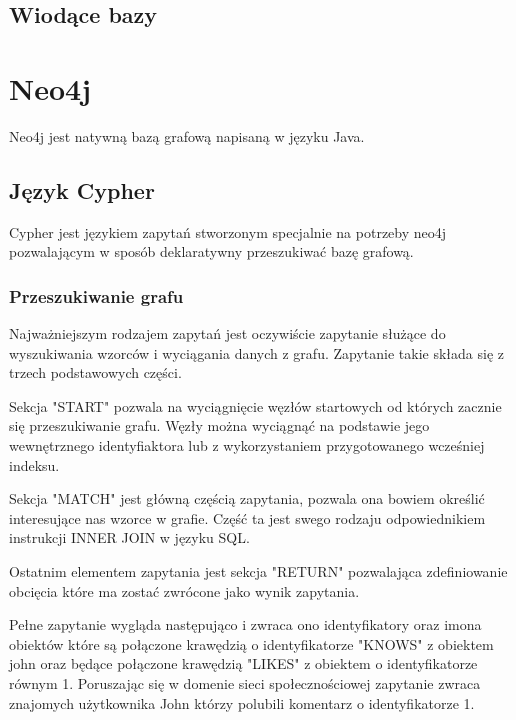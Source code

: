 \documentclass[brudnopis]{xmgr}
\begin{document}
\section{Wiodące bazy}

\chapter{Neo4j}

Neo4j jest natywną bazą grafową napisaną w języku Java. 

\section{Język Cypher}
Cypher jest językiem zapytań stworzonym specjalnie na potrzeby neo4j pozwalającym w sposób deklaratywny przeszukiwać bazę grafową.

\subsection{Przeszukiwanie grafu}

Najważniejszym rodzajem zapytań jest oczywiście zapytanie służące do wyszukiwania wzorców i wyciągania danych z grafu. Zapytanie takie składa się z trzech podstawowych części.

Sekcja "START" pozwala na wyciągnięcie węzłów startowych od których zacznie się przeszukiwanie grafu. Węzły można wyciągnąć na podstawie jego wewnętrznego identyfiaktora lub z wykorzystaniem przygotowanego wcześniej indeksu.



Sekcja "MATCH" jest główną częścią zapytania, pozwala ona bowiem określić interesujące nas wzorce w grafie. Część ta jest swego rodzaju odpowiednikiem instrukcji INNER JOIN w języku SQL.



Ostatnim elementem zapytania jest sekcja "RETURN" pozwalająca zdefiniowanie obcięcia które ma zostać zwrócone jako wynik zapytania.



Pełne zapytanie wygląda następująco i zwraca ono identyfikatory oraz imona obiektów które są połączone krawędzią o identyfikatorze "KNOWS" z obiektem john oraz będące połączone krawędzią "LIKES" z obiektem o identyfikatorze równym 1. Poruszając się w domenie sieci społecznościowej zapytanie zwraca znajomych użytkownika John którzy polubili komentarz o identyfikatorze 1.
\end{document}
